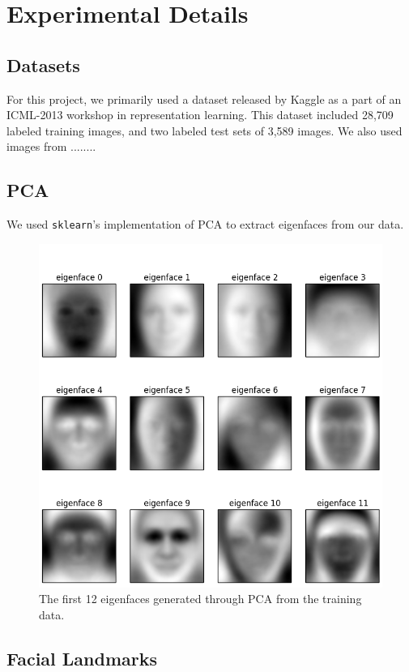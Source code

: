 \documentclass[11pt, twocolumn, twoside]{article}
\begin{document}
\section{Experimental Details}

\subsection{Datasets}

For this project, we primarily used a dataset released by Kaggle as a part of an
ICML-2013 workshop in representation learning. This dataset included 28,709 labeled
training images, and two labeled test sets of 3,589 images. We also used images from
........

\subsection{PCA}
We used \texttt{sklearn}'s implementation of PCA to extract eigenfaces from our data.

\begin{figure}
\centering
\includegraphics[width=\textwidth]{eigenfaces}
\caption{\label{fig:eigenfaces} The first 12 eigenfaces generated through PCA from the
training data.}
\end{figure}

\subsection{Facial Landmarks}
\end{document}
